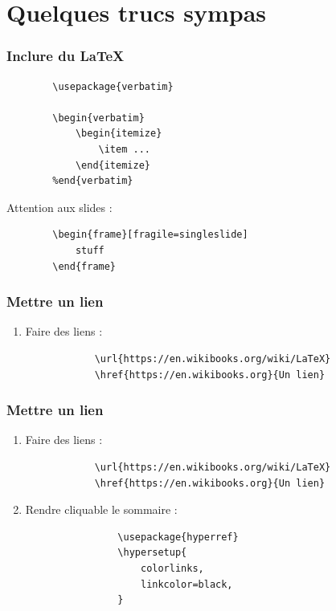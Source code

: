 \documentclass[handout]{beamer}
\begin{document}
\section{Quelques trucs sympas}

\begin{frame}[fragile=singleslide]
	\frametitle{Inclure du \LaTeX}

	\centering

	\begin{verbatim}
		\usepackage{verbatim}

		\begin{verbatim}
			\begin{itemize}
				\item ...
			\end{itemize}
		%end{verbatim}

	\end{verbatim}

	Attention aux slides :\\
	\begin{verbatim}
		\begin{frame}[fragile=singleslide]
			stuff
		\end{frame}
	\end{verbatim}

\end{frame}

\begin{frame}[fragile=singleslide]
	\frametitle{Mettre un lien}

	\begin{enumerate}
		\item Faire des liens :\\
			\begin{verbatim}
			\url{https://en.wikibooks.org/wiki/LaTeX}
			\href{https://en.wikibooks.org}{Un lien}
			\end{verbatim}
	\end{enumerate}
\end{frame}

\begin{frame}[fragile=singleslide]
	\frametitle{Mettre un lien}

	\begin{enumerate}
		\item Faire des liens :\\
			\begin{verbatim}
			\url{https://en.wikibooks.org/wiki/LaTeX}
			\href{https://en.wikibooks.org}{Un lien}
			\end{verbatim}
		\item Rendre cliquable le sommaire :\\
			\begin{verbatim}
				\usepackage{hyperref}
				\hypersetup{
    				colorlinks,
    				linkcolor=black,
				}
			\end{verbatim}
	\end{enumerate}
\end{frame}
\end{document}
